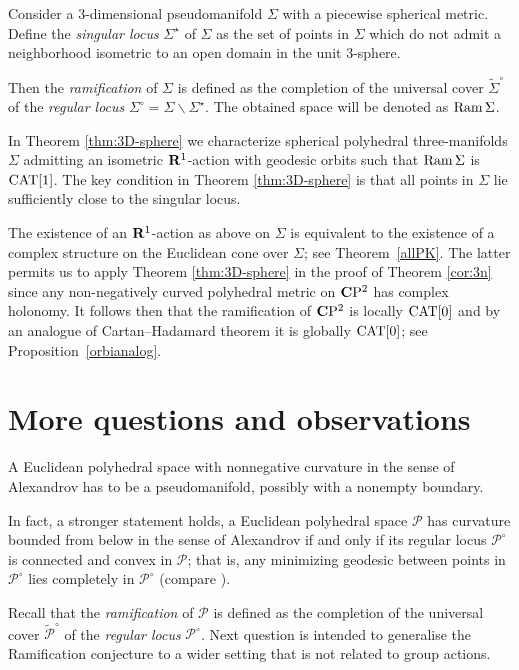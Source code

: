 \documentclass{compositio}
\begin{document}
Consider a $3$-dimensional pseudomanifold $\Sigma$ with a piecewise spherical metric.
Define the \emph{singular locus} $\Sigma^{{\star}}$ of $\Sigma$
as the set of points in $\Sigma$ which do not admit a neighborhood isometric to an open domain in
the unit $3$-sphere.

Then the {\it ramification} of $\Sigma$
is defined as the  completion of the universal cover $\tilde {\Sigma}^\circ$ of the \emph{regular locus} $\Sigma^\circ=\Sigma\backslash\Sigma^{{\star}}$.
The obtained space will be denoted as $\mathop{\rm Ram}\nolimits\Sigma$.

In Theorem \ref{thm:3D-sphere} we  characterize  spherical polyhedral three-manifolds $\Sigma$
admitting an isometric $\mathbf{R}^1$-action with geodesic orbits such that $\mathop{\rm Ram}\nolimits\Sigma$ is $\mathrm{CAT}[1]$.
The key condition in Theorem \ref{thm:3D-sphere} is that all points in $\Sigma$  lie sufficiently close to the singular locus.

The existence of an $\mathbf{R}^1$-action as above on $\Sigma$ is equivalent to the existence of
a complex structure on the Euclidean cone over $\Sigma$;
see Theorem~\ref{allPK}. 
The latter permits us to apply Theorem \ref{thm:3D-sphere} in the proof of Theorem \ref{cor:3n}
since any non-negatively curved polyhedral metric on $\mathbf{C}\mathrm{P}^2$ has complex holonomy.
It follows then that the ramification of $\mathbf{C}\mathrm{P}^2$ is locally $\mathrm{CAT}[0]$ and by an analogue of Cartan--Hadamard theorem it is globally $\mathrm{CAT}[0]$;
see Proposition~\ref{orbianalog}.





\section{More questions and observations}\label{sec:questions}

A Euclidean polyhedral space with
nonnegative curvature in the sense of Alexandrov has to be a pseudomanifold, possibly with a nonempty boundary.

In fact, a stronger statement holds,
a Euclidean polyhedral space $\mathcal{P}$
has curvature bounded from below in the sense of Alexandrov
if and only if
its regular locus $\mathcal{P}^\circ$
is connected and convex in $\mathcal{P}$;
that is, any minimizing geodesic between points in $\mathcal{P}^\circ$ lies completely in $\mathcal{P}^\circ$ (compare \cite[Theorem 5]{milka}).

Recall that the {\it ramification} of $\mathcal{P}$
is defined as the  completion of the universal cover $\tilde {\mathcal{P}}^\circ$ of the \emph{regular locus} $\mathcal{P}^\circ$.
Next question is intended to generalise the Ramification conjecture 
to a wider setting that is not related to group actions.
\end{document}
